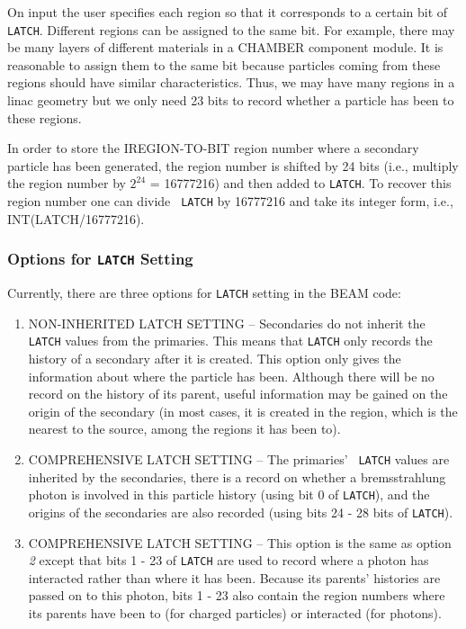 \documentclass[12pt,twoside]{article}
\begin{document}
On input the user specifies each region so that it corresponds to a
certain bit of {\tt LATCH}. Different regions can be assigned to the same bit.
For example, there may be many layers of different materials in a
CHAMBER component module. It is reasonable to assign them to the same bit
because particles coming from these regions should have similar
characteristics. Thus, we may have many regions in a linac geometry but we
only need 23 bits to record whether a particle has been to these regions.

In order to store the IREGION-TO-BIT region number where a secondary
particle has been generated, the region number is shifted by 24 bits
(i.e., multiply the region number by $2^{24}$ = 16777216) and then added
to {\tt LATCH}. To recover this region number one can divide {\tt
LATCH} by 16777216
and take its integer form, i.e., INT(LATCH/16777216).

\subsubsection{Options for {\tt LATCH} Setting}

Currently, there are three options for {\tt LATCH} setting in the BEAM
code\cite{Ro95b}:
\begin{enumerate}
\item  NON-INHERITED LATCH SETTING -- Secondaries do not inherit
the {\tt LATCH} values from the primaries. This means that {\tt LATCH} only records
the history of a secondary after it is created. This option only
gives the information about where the particle has been. Although there
will be no record on the history of its parent, useful information may be
gained on the origin of the secondary (in most cases,  it is created in
the region, which is the nearest to the source, among the regions it has
been to).

\item  COMPREHENSIVE LATCH SETTING -- The primaries' {\tt
LATCH} values are inherited by the secondaries,
there is a record on whether a bremsstrahlung photon is involved in this
particle history (using bit 0 of {\tt LATCH}), and the origins of the
secondaries are also recorded (using bits 24 - 28 bits of {\tt LATCH}).

\item  COMPREHENSIVE LATCH SETTING -- This option is the same
as option {\it 2} except that bits 1 - 23 of {\tt LATCH} are used to
record where a photon has interacted rather than where it has been.
Because its parents' histories are passed on to this photon, bits 1 - 23
also contain the region numbers where its parents have been to (for
charged particles) or interacted (for photons).

\end{enumerate}
\end{document}
